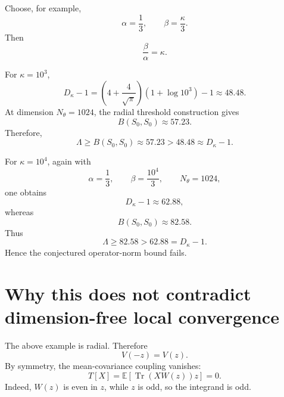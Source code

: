 \documentclass[11pt]{article}
\numberwithin{equation}{section}
\DeclareMathOperator{\Tr}{Tr}
\begin{document}
Choose, for example,
\begin{equation}
    \alpha=\frac13,
    \qquad
    \beta=\frac{\kappa}{3}.
\end{equation}
Then
\begin{equation}
    \frac{\beta}{\alpha}=\kappa.
\end{equation}

For $\kappa=10^3$,
\begin{equation}
    D_\kappa-1
    =
    \left(4+\frac{4}{\sqrt{\pi}}\right)(1+\log 10^3)-1
    \approx
    48.48.
\end{equation}
At dimension $N_\theta=1024$, the radial threshold construction gives
\begin{equation}
    B(S_0,S_0)
    \approx
    57.23.
\end{equation}
Therefore,
\begin{equation}
    \Lambda
    \ge
    B(S_0,S_0)
    \approx
    57.23
    >
    48.48
    \approx
    D_\kappa-1.
\end{equation}

For $\kappa=10^4$, again with
\begin{equation}
    \alpha=\frac13,
    \qquad
    \beta=\frac{10^4}{3},
    \qquad
    N_\theta=1024,
\end{equation}
one obtains
\begin{equation}
    D_\kappa-1
    \approx
    62.88,
\end{equation}
whereas
\begin{equation}
    B(S_0,S_0)
    \approx
    82.58.
\end{equation}
Thus
\begin{equation}
    \Lambda
    \ge
    82.58
    >
    62.88
    =
    D_\kappa-1.
\end{equation}
Hence the conjectured operator-norm bound fails.

\section{Why this does not contradict dimension-free local convergence}

The above example is radial. 
Therefore
\begin{equation}
    V(-z)=V(z).
\end{equation}
By symmetry, the mean-covariance coupling vanishes:
\begin{equation}
    T[X]
    =
    \mathbb E[
    \Tr(XW(z))z
    ]
    =
    0.
\end{equation}
Indeed, $W(z)$ is even in $z$, while $z$ is odd, so the integrand is odd.
\end{document}
